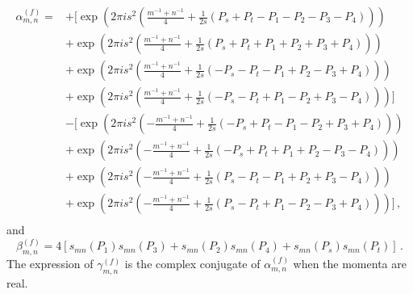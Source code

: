 \documentclass[11pt]{article}
\begin{document}
\begin{equation}\label{eq:alpha}
    \begin{aligned}
        \alpha_{m,n}^{(f)}=&+\Bigg[\exp\left(2\pi i s^2\left(\frac{m^{-1}+n^{-1}}{4}+\frac{1}{2s}(P_s+P_t-P_1-P_2-P_3-P_4)\right)\right)\\
        &+\exp\left(2\pi i s^2\left(\frac{m^{-1}+n^{-1}}{4}+\frac{1}{2s}(P_s+P_t+P_1+P_2+P_3+P_4)\right)\right)\\
        &+\exp\left(2\pi i s^2\left(\frac{m^{-1}+n^{-1}}{4}+\frac{1}{2s}(-P_s-P_t-P_1+P_2-P_3+P_4)\right)\right)\\
        &+\exp\left(2\pi i s^2\left(\frac{m^{-1}+n^{-1}}{4}+\frac{1}{2s}(-P_s-P_t+P_1-P_2+P_3-P_4)\right)\right) \Bigg]\\
        &-\Bigg[\exp\left(2\pi i s^2\left(-\frac{m^{-1}+n^{-1}}{4}+\frac{1}{2s}(-P_s+P_t-P_1-P_2+P_3+P_4)\right)\right)\\
        &+\exp\left(2\pi i s^2\left(-\frac{m^{-1}+n^{-1}}{4}+\frac{1}{2s}(-P_s+P_t+P_1+P_2-P_3-P_4)\right)\right)\\
        &+\exp\left(2\pi i s^2\left(-\frac{m^{-1}+n^{-1}}{4}+\frac{1}{2s}(P_s-P_t-P_1+P_2+P_3-P_4)\right)\right)\\
        &+\exp\left(2\pi i s^2\left(-\frac{m^{-1}+n^{-1}}{4}+\frac{1}{2s}(P_s-P_t+P_1-P_2-P_3+P_4)\right)\right) \Bigg]\,,\\
    \end{aligned}
\end{equation}
and 
\begin{equation}
    \beta_{m,n}^{(f)}=4\left[s_{mn}(P_1)s_{mn}(P_3)+s_{mn}(P_2)s_{mn}(P_4)+s_{mn}(P_s)s_{mn}(P_t)\right]\,.
\end{equation}
The expression of $\gamma_{m,n}^{(f)}$ is  the complex conjugate of $\alpha_{m,n}^{(f)}$ when the momenta are real. 
\end{document}
